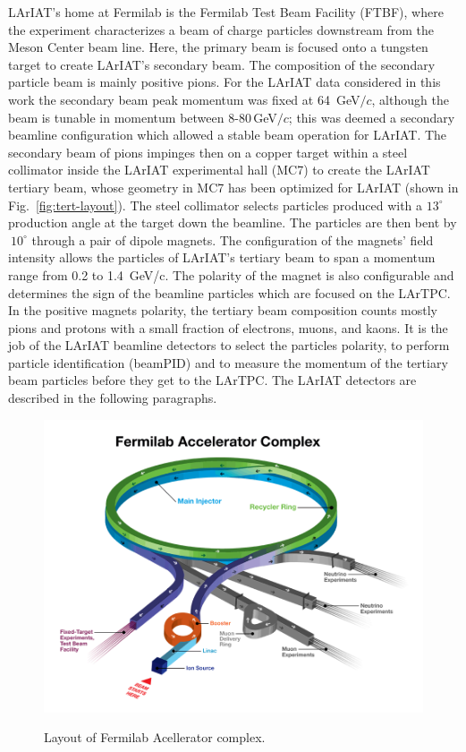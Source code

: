 LArIAT's home at Fermilab is the Fermilab Test Beam Facility (FTBF), where the experiment characterizes a beam of charge particles downstream from the Meson Center beam line. 
Here, the primary beam is focused onto a tungsten target to create LArIAT's secondary beam. The composition of the secondary particle beam is mainly positive pions. For the LArIAT data considered in this work the secondary beam peak momentum was fixed at 64~GeV$/c$, although the beam is tunable in momentum between 8-80\,GeV$/c$; this was deemed a secondary beamline configuration which allowed a stable beam operation for LArIAT.
The secondary beam of pions impinges then on a copper target within a steel collimator inside the LArIAT experimental hall (MC7) to create the LArIAT tertiary beam, whose geometry in MC7 has been optimized for LArIAT (shown in  Fig.~\ref{fig:tert-layout}).   The steel collimator selects particles produced with a $13^\circ$ production angle at the target down the beamline.  The particles are then bent by  $~10^\circ$  through a pair of dipole magnets.  The configuration of the magnets' field intensity allows the particles of LArIAT's tertiary beam to span a momentum range from 0.2 to 1.4~GeV/c. The polarity of the magnet is also configurable and determines the sign of the beamline particles which are focused on the LArTPC. In the positive magnets polarity, the tertiary beam composition counts mostly pions and protons with a small fraction of electrons, muons, and kaons. It is the job of the LArIAT beamline detectors to select the particles polarity,  to perform particle identification (beamPID) and to measure the momentum of the tertiary beam particles before they get to the LArTPC. The LArIAT detectors are described in the following paragraphs.  



\begin{figure}
  \centering  	
\includegraphics[width=\textwidth,height=\textheight,keepaspectratio]{Chapter-3/Images/AcceleratorFNAL.png}
\label{fig:Accelerator}
\caption{Layout of Fermilab Acellerator complex.}
\end{figure}

